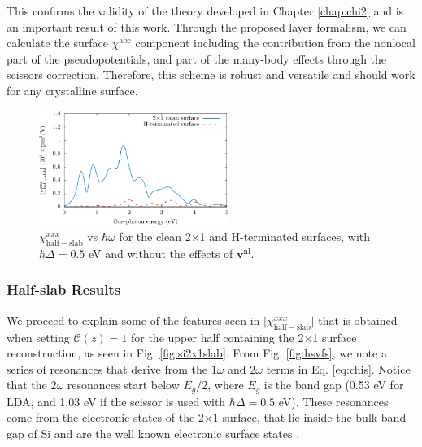 This confirms the validity of the theory developed in Chapter \ref{chap:chi2}
and is an important result of this work. Through the proposed layer formalism,
we can calculate the surface $\chi^{\mathrm{abc}}$ component including the
contribution from the nonlocal part of the pseudopotentials, and part of the
many-body effects through the scissors correction. Therefore, this scheme is
robust and versatile and should work for any crystalline surface.

\begin{figure}[b]
\centering 
\includegraphics[width=0.55\textwidth]{content/figures/fig-Si2x1-topvbottom}
\caption[$\chi^{xxx}_{\mathrm{half-slab}}$ for the clean and H-terminated 
surfaces.]
{$\chi^{xxx}_{\mathrm{half-slab}}$ vs $\hbar\omega$ for the clean
2$\times$1 and H-terminated surfaces, with $\hbar\Delta = 0.5$ eV and without
the effects of $\mathbf{v}^\mathrm{nl}$.}
\label{fig:topvbottom}
\end{figure}



\subsubsection{Half-slab Results}

We proceed to explain some of the features seen in
$\vert\chi^{xxx}_{\mathrm{half-slab}}\vert$ that is obtained when setting
$\mathbf{\mathcal{C}}(z) = 1$ for the upper half containing the 2$\times$1
surface reconstruction, as seen in Fig. \ref{fig:si2x1slab}. From Fig.
\ref{fig:hsvfs}, we note a series of resonances that derive from the $1\omega$
and $2\omega$ terms in Eq. \eqref{eq:chis}. Notice that the $2\omega$ resonances
start below $E_{g}/2$, where $E_{g}$ is the band gap (0.53 eV for LDA, and 1.03
eV if the scissor is used with $\hbar\Delta=0.5$ eV). These resonances come from
the electronic states of the 2$\times$1 surface, that lie inside the bulk band
gap of Si and are the well known electronic surface states \cite{rohlfingPRB95}.


